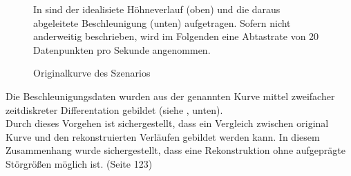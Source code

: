\begin{figure}[ht!]
\vspace{0.25cm}
\begin{center}
\caption{Originalkurve des Szenarios}
\label{fig:SzeneOrigin}
\end{center}

\vspace{0.25cm}
In  sind der idealisiete Höhneverlauf (oben) und die daraus abgeleitete Beschleunigung (unten) aufgetragen. Sofern nicht anderweitig beschrieben, wird im Folgenden eine Abtastrate von 20 Datenpunkten pro Sekunde angenommen.
\end{figure}

Die Beschleunigungsdaten wurden aus der genannten Kurve mittel zweifacher zeitdiskreter Differentation gebildet (siehe , unten).\\
Durch dieses Vorgehen ist sichergestellt, dass ein Vergleich zwischen original Kurve und den rekonstruierten Verläufen gebildet werden kann. In diesem Zusammenhang wurde sichergestellt, dass eine Rekonstruktion ohne aufgeprägte Störgrößen möglich ist. (Seite 123)


